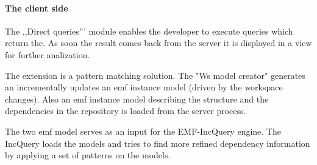 \paragraph{The client side} The ,,Direct queries''' module enables the developer to execute queries which return the. As soon the result comes back from the server it is displayed in a view for further analization.

The extension is a pattern matching solution. The "Ws model creator" generates an incrementally updates an emf instance model (driven by the workspace changes). Also an emf instance model describing the structure and the dependencies in the repository is loaded from the server process. 

The two emf model serves as an input for the EMF-IncQuery engine. The IncQuery loads the models and tries to find more refined dependency information by applying a set of patterns on the models. 